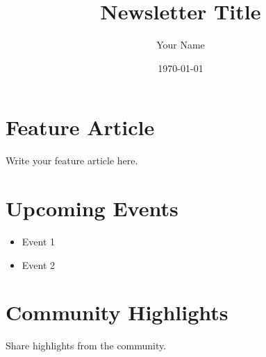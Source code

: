 \documentclass[a4paper,11pt]{article}
\title{Newsletter Title}
\author{Your Name}
\date{\today}
\begin{document}
\maketitle

\section*{Feature Article}
Write your feature article here.

\section*{Upcoming Events}
\begin{itemize}
    \item Event 1
    \item Event 2
\end{itemize}

\section*{Community Highlights}
Share highlights from the community.
\end{document}
